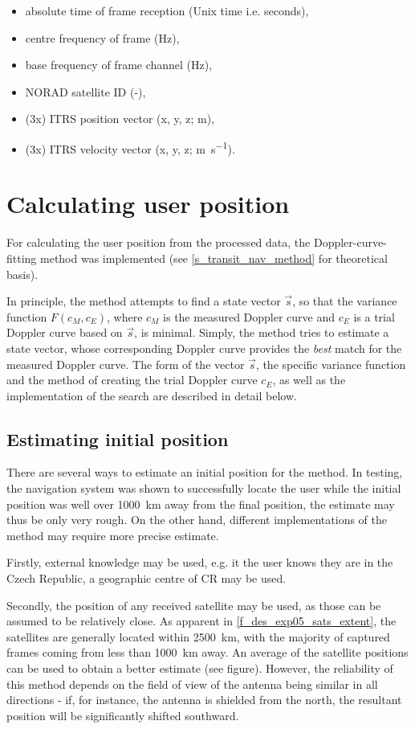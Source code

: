 \begin{itemize}
    \item absolute time of frame reception (Unix time i.e. seconds),
    \item centre frequency of frame (Hz),
    \item base frequency of frame channel (Hz),
    \item NORAD satellite ID (-),
    \item (3x) ITRS position vector (x, y, z; m),
    \item (3x) ITRS velocity vector (x, y, z; \unit{\m\per\s}).
\end{itemize}



\section{Calculating user position}
For calculating the user position from the processed data, the Doppler-curve-fitting method was implemented (see \autoref{s_transit_nav_method} for theoretical basis). %

In principle, the method attempts to find a state vector $\Vec{s}$, so that the variance function $F(c_M, c_E)$, where $c_M$ is the measured Doppler curve and $c_E$ is a trial Doppler curve based on $\Vec{s}$, is minimal. Simply, the method tries to estimate a state vector, whose corresponding Doppler curve provides the \textit{best} match for the measured Doppler curve. The form of the vector $\Vec{s}$, the specific variance function and the method of creating the trial Doppler curve $c_E$, as well as the implementation of the search are described in detail below.

\subsection{Estimating initial position}
There are several ways to estimate an initial position for the method. In testing, the navigation system was shown to successfully locate the user while the initial position was well over \qty{1000}{km} away from the final position, the estimate may thus be only very rough. On the other hand, different implementations of the method may require more precise estimate.

Firstly, external knowledge may be used, e.g. it the user knows they are in the Czech Republic, a geographic centre of CR may be used.

Secondly, the position of any received satellite may be used, as those can be assumed to be relatively close. As apparent in \autoref{f_des_exp05_sats_extent}, the satellites are generally located within \qty{2500}{km}, with the majority of captured frames coming from less than \qty{1000}{km} away. An average of the satellite positions can be used to obtain a better estimate (see figure). However, the reliability of this method depends on the field of view of the antenna being similar in all directions - if, for instance, the antenna is shielded from the north, the resultant position will be significantly shifted southward.

